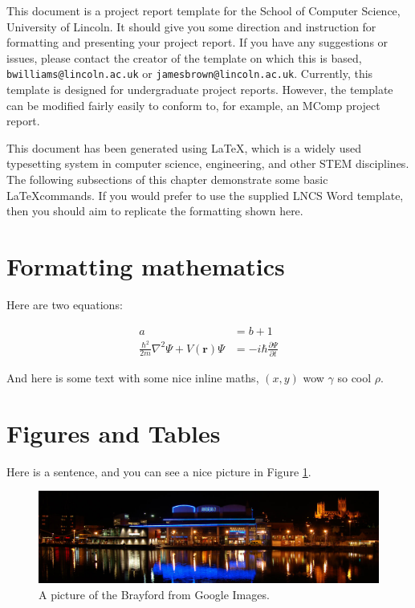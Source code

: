 This document is a project report template for the School of Computer Science, University of Lincoln. It should give you some direction and instruction for formatting and presenting your project report. If you have any suggestions or issues, please contact the creator of the template on which this is based, \texttt{bwilliams@lincoln.ac.uk} or \texttt{jamesbrown@lincoln.ac.uk}. Currently, this template is designed for undergraduate project reports. However, the template can be modified fairly easily to conform to, for example, an MComp project report.

This document has been generated using \LaTeX, which is a widely used typesetting system in computer science, engineering, and other STEM disciplines. The following subsections of this chapter demonstrate some basic \LaTeX commands. If you would prefer to use the supplied LNCS Word template, then you should aim to replicate the formatting shown here.

\section{Formatting mathematics}
Here are two equations:

\begin{align}
a &= b + 1 \\
\frac{\hbar^2}{2m}\nabla^2\Psi + V(\mathbf{r})\Psi
&= -i\hbar \frac{\partial\Psi}{\partial t}    
\end{align}


And here is some text with some nice inline maths, $(x, y)$ wow $\gamma$ so cool $\rho$.

\section{Figures and Tables}

Here is a sentence, and you can see a nice picture in Figure \ref{fig:brayford}.

\begin{figure}[h]
    \centering
    \includegraphics[width=\textwidth]{figures/brayford.jpg}
    \caption{A picture of the Brayford from Google Images.}
    \label{fig:brayford}
\end{figure}

